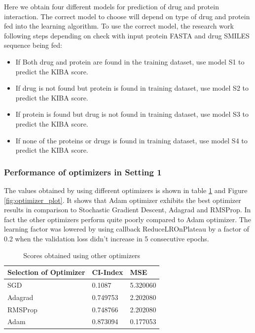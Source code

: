 Here we obtain four different models for prediction of drug and protein interaction. The correct model to choose will depend on type of drug and protein fed into the learning algorithm. To use the correct model, the research work following steps depending on check with input protein FASTA and drug SMILES sequence being fed:
\begin{itemize}
    \item If Both drug and protein are found in the training dataset, use model S1 to predict the KIBA score.
    \item If drug is not found but protein is found in training dataset, use model S2 to predict the KIBA score.
    \item If protein is found but drug is not found in training dataset, use model S3 to predict the KIBA score.
    \item If none of the proteins or drugs is found in training dataset, use model S4 to predict the KIBA score.
\end{itemize}

\subsubsection{Performance of optimizers in Setting 1}

The values obtained by using different optimizers is shown in table \ref{table:optimizer} and Figure \ref{fig:optimizer_plot}. It shows that Adam optimizer exhibits the best optimizer results in comparison to Stochastic Gradient Descent, Adagrad and RMSProp. In fact the other optimizers perform quite poorly compared to Adam optimizer. The learning factor was lowered by using callback ReduceLROnPlateau by a factor of 0.2 when the validation loss didn't increase in 5 consecutive epochs.

\begin{table} [H]
    \centering
    \caption[Scores of different Optimizer] {Scores obtained using other optimizers}
    \label{table:optimizer}
    \begin{tabular}{|l|l|l|}
        \hline
        
        Selection of Optimizer & CI-Index & MSE \\ \toprule 
        
        \hline
        SGD & 0.1087 & 5.320060 \\ \hline
        Adagrad & 0.749753 & 2.202080 \\ \hline
        RMSProp & 0.748766 & 2.202080 \\ \hline
        Adam    & 0.873094 & 0.177053 \\ \hline
        
    \end{tabular}
    
\end{table}

